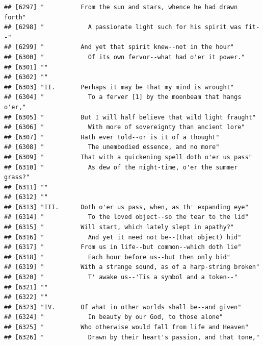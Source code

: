 \documentclass{article}\usepackage[]{graphicx}\usepackage[]{color}
\makeatletter
\newenvironment{kframe}{%
 \def\at@end@of@kframe{}%
 \ifinner\ifhmode%
  \def\at@end@of@kframe{\end{minipage}}%
  \begin{minipage}{\columnwidth}%
 \fi\fi%
 \def\FrameCommand##1{\hskip\@totalleftmargin \hskip-\fboxsep
 \colorbox{shadecolor}{##1}\hskip-\fboxsep
     \hskip-\linewidth \hskip-\@totalleftmargin \hskip\columnwidth}%
 \MakeFramed {\advance\hsize-\width
   \@totalleftmargin\z@ \linewidth\hsize
   \@setminipage}}%
 {\par\unskip\endMakeFramed%
 \at@end@of@kframe}
\newenvironment{knitrout}{}{} %
\makeatother
\begin{document}
\begin{knitrout}
\begin{kframe}
\begin{verbatim}
## [6297] "          From the sun and stars, whence he had drawn forth"                 
## [6298] "            A passionate light such for his spirit was fit--"                
## [6299] "          And yet that spirit knew--not in the hour"                         
## [6300] "            Of its own fervor--what had o'er it power."                      
## [6301] ""                                                                            
## [6302] ""                                                                            
## [6303] "II.       Perhaps it may be that my mind is wrought"                         
## [6304] "            To a ferver [1] by the moonbeam that hangs o'er,"                
## [6305] "          But I will half believe that wild light fraught"                   
## [6306] "            With more of sovereignty than ancient lore"                      
## [6307] "          Hath ever told--or is it of a thought"                             
## [6308] "            The unembodied essence, and no more"                             
## [6309] "          That with a quickening spell doth o'er us pass"                    
## [6310] "            As dew of the night-time, o'er the summer grass?"                
## [6311] ""                                                                            
## [6312] ""                                                                            
## [6313] "III.      Doth o'er us pass, when, as th' expanding eye"                     
## [6314] "            To the loved object--so the tear to the lid"                     
## [6315] "          Will start, which lately slept in apathy?"                         
## [6316] "            And yet it need not be--(that object) hid"                       
## [6317] "          From us in life--but common--which doth lie"                       
## [6318] "            Each hour before us--but then only bid"                          
## [6319] "          With a strange sound, as of a harp-string broken"                  
## [6320] "            T' awake us--'Tis a symbol and a token--"                        
## [6321] ""                                                                            
## [6322] ""                                                                            
## [6323] "IV.       Of what in other worlds shall be--and given"                       
## [6324] "            In beauty by our God, to those alone"                            
## [6325] "          Who otherwise would fall from life and Heaven"                     
## [6326] "            Drawn by their heart's passion, and that tone,"                  

\end{verbatim}
\end{kframe}
\end{knitrout}
\end{document}
